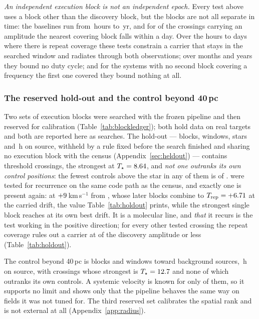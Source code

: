 \emph{An independent execution block is not an independent epoch.} Every test
above uses a block other than the discovery block, but the blocks are not all
separate in time: the baselines run from \RcSepMinH\,hours to \RcSepMaxYr\,yr,
and for \RcNSepSameDay{} of the \RcNExclPoss{} crossings carrying an amplitude the
nearest covering block falls within a day. Over the hours to days where there
is repeat coverage these tests constrain a carrier that stays in the searched
window and radiates through both observations; over months and years they
bound no duty cycle; and for the \RcNoRepSysAll{} systems with no second block
covering a frequency the first one covered they bound nothing at all.

\subsubsection{The reserved hold-out and the control beyond 40\,pc}
\label{sec:holdoutsearch}

Two sets of execution blocks were searched with the frozen pipeline and then
reserved for calibration (Table~\ref{tab:blockledger}); both hold data on real
targets and both are reported here as searches. The hold-out --- \HoNBlock{}
blocks, \HoNWin{} windows, \HoNStar{} stars and \HoHours\,h on source,
withheld by a rule fixed before the search finished and sharing no execution
block with the census (Appendix~\ref{sec:heldout}) --- contains \HoNCross{}
threshold crossings, the strongest at $T_\star=8.64$, and \emph{not one
outranks its own control positions}: the fewest controls above the star in any
of them is \HoNCtrlMin{} of \NCtrl. \HoNTested{} were tested for recurrence on the same
code path as the census, and exactly one is present again: \HoRecStar{} at
$+9$\,km\,s$^{-1}$ from \HoRecLine, whose \HoRecNRep{} later blocks
combine to $T_{\rm rep}=+6.71$ at the carried drift, the value
Table~\ref{tab:holdout} prints, while the strongest single block reaches
\HoRecTAnyDrift{} at its own best drift. It is a molecular line, and \emph{that} it recurs is the test
working in the positive direction; for every other tested crossing the repeat
coverage rules out a carrier at \HoFracMax{} of the discovery amplitude or
less (Table~\ref{tab:holdout}).

The control beyond 40\,pc is \OosNBlock{} blocks and \OosNWin{} windows toward
\OosNStar{} background sources, \OosHours\,h on source, with \OosNCross{}
crossings whose strongest is $T_\star=12.7$ and none of which outranks its
own controls. A systemic velocity is known for only \OosNVsys{} of them, so it
supports no limit and shows only that the pipeline behaves the same way on
fields it was not tuned for. The third reserved set calibrates the spatial rank
and is not external at all (Appendix~\ref{app:radius}).

